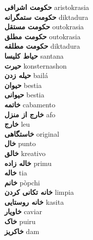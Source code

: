 \textbf{ حکومت اشرافی  } aristokrasia \\
\textbf{ حکومت ستمگرانه  } diktadura \\
\textbf{ حکومت مستقل  } outokrasia \\
\textbf{ حکومت مطلق  } outokrasia \\
\textbf{ حکومت مطلقه  } diktadura \\
\textbf{ حیاط کلیسا  } santana \\
\textbf{ حیرت  } konsternashon \\
\textbf{ حیله زدن  } bailá \\
\textbf{ حیوان  } bestia \\
\textbf{ حیوانی  } bestia \\
\textbf{ خاتمه  } cabamento \\
\textbf{ خارج از منزل  } afo \\
\textbf{ خارج  } leu \\
\textbf{ خاستگاهی  } original \\
\textbf{ خال  } punto \\
\textbf{ خالق  } kreativo \\
\textbf{ خاله زاده  } primu \\
\textbf{ خاله  } tia \\
\textbf{ خانم  } pòpchi \\
\textbf{ خانه تکانی کردن  } limpia \\
\textbf{ خانه روستایی  } kasita \\
\textbf{ خاویار  } caviar \\
\textbf{ خاک  } puiru \\
\textbf{ خاکریز  } dam \\
